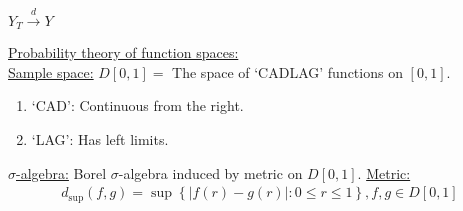 \documentclass[11pt]{elegantbook}
\begin{document}
\begin{claim}
    $Y_T \stackrel{d}{\longrightarrow} Y$
\end{claim}
\underline{Probability theory of function spaces:}\\
\underline{Sample space:} $D[0,1]=$ The space of `CADLAG' functions on $[0,1]$.
\begin{enumerate}[$\cdot$]
    \item `CAD': Continuous from the right.
    \item `LAG': Has left limits.
\end{enumerate}
\underline{$\sigma$-algebra:} Borel $\sigma$-algebra induced by metric on $D[0,1]$.
\underline{Metric:}
\begin{equation}
    \begin{aligned}
        d_{\sup}(f,g)=\sup\left\{|f(r)-g(r)|:0\leq r\leq 1\right\}, f,g\in D[0,1]
    \end{aligned}
    \nonumber
\end{equation}
























\appendix

\end{document}
